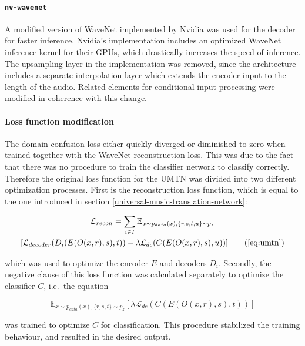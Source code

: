\documentclass[12pt,a4paper,]{report}
\begin{document}
\paragraph{\texttt{nv-wavenet}}

A modified version of WaveNet implemented by Nvidia was used for the
decoder for faster inference. Nvidia's implementation includes an
optimized WaveNet inference kernel for their GPUs, which drastically
increases the speed of inference. The upsampling layer in the
implementation was removed, since the architecture includes a separate
interpolation layer which extends the encoder input to the length of the
audio. Related elements for conditional input processing were modified
in coherence with this change.

\paragraph{Loss function modification \label{loss-function-modification}}

The domain confusion loss either quickly diverged or diminished to zero
when trained together with the WaveNet reconstruction loss. This was due
to the fact that there was no procedure to train the classifier network
to classify correctly. Therefore the original loss function for the UMTN
was divided into two different optimization processes. First is the
reconstruction loss function, which is equal to the one introduced in
section \ref{universal-music-translation-network}:

\begin{multline}
    \mathcal{L}_{recon} = \sum_{i \in I} \mathbb{E}_{x \sim p_{data}(x), \{r, s, t, u\} \sim p_{z}} \\
    [\mathcal{L}_{decoder}(D_i(E(O(x, r), s), t))  - \lambda \mathcal{L}_{dc}(C(E(O(x, r), s), u))] \tag{\ref{eq:umtn}}
\end{multline}

which was used to optimize the encoder \(E\) and decoders \(D_i\).
Secondly, the negative clause of this loss function was calculated
separately to optimize the classifier \(C\), i.e.~the equation

\begin{equation}
    \mathbb{E}_{x \sim p_{data}(x), \{r, s, t\} \sim p_{z}} [\lambda \mathcal{L}_{dc}(C(E(O(x, r), s), t))] \label{eq:dcloss}
\end{equation}

was trained to optimize \(C\) for classification. This procedure
stabilized the training behaviour, and resulted in the desired output.
\end{document}
